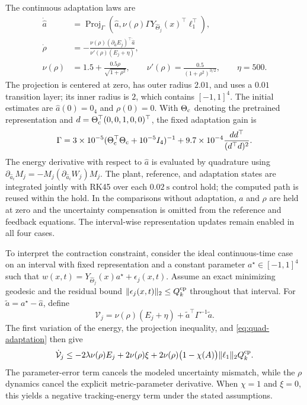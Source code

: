\documentclass[11pt]{article}
\begin{document}
The continuous adaptation laws are
\begin{equation}\label{eq:quad-adaptation}
\begin{aligned}
    \dot{\hat a}&=\operatorname{Proj}_{\Gamma}\left(
       \hat a,\nu(\rho)\Gamma Y_{\hat\Theta_j}(x)^\top\ell_1^\top\right),\\
    \dot\rho&=-\frac{\nu(\rho)
       (\partial_{\hat a}E_j)^\top\dot{\hat a}}
       {\nu'(\rho)(E_j+\eta)},\\
    \nu(\rho)&=1.5+\frac{0.5\rho}{\sqrt{1+\rho^2}},\qquad
    \nu'(\rho)=\frac{0.5}{(1+\rho^2)^{3/2}},\qquad\eta=500.
\end{aligned}
\end{equation}
The projection is centered at zero, has outer radius $2.01$, and uses
a $0.01$ transition layer; its inner radius is $2$, which contains
$[-1,1]^4$. The initial estimates are $\hat a(0)=0_4$ and $\rho(0)=0$.
With $\Theta_{\rm c}$ denoting the pretrained representation and
$d=\Theta_{\rm c}^\top(0,0,1,0,0)^\top$, the fixed adaptation gain is
\begin{equation}
    \Gamma=3\times10^{-5}
        (\Theta_{\rm c}^\top\Theta_{\rm c}+10^{-5}I_4)^{-1}
        +9.7\times10^{-4}\frac{dd^\top}{(d^\top d)^2}.
\end{equation}
The energy derivative with respect to $\hat a$ is evaluated by quadrature
using $\partial_{\hat a_i}M_j=-M_j(\partial_{\hat a_i}W_j)M_j$.
The plant, reference, and adaptation states are integrated jointly
with RK45 over each $0.02~\mathrm s$ control hold; the computed path
is reused within the hold. In the comparisons without adaptation,
$\hat a$ and $\rho$ are held at zero and the uncertainty compensation
is omitted from the reference and feedback equations.
The interval-wise representation updates remain enabled in all four cases.

To interpret the contraction constraint, consider the ideal continuous-time
case on an interval with fixed representation and a constant parameter
$a^\star\in[-1,1]^4$ such that
$w(x,t)=Y_{\hat\Theta_j}(x)a^\star+\epsilon_j(x,t)$.
Assume an exact minimizing geodesic and the residual bound
$\|\epsilon_j(x,t)\|_2\le Q_k^{\rm cp}$ throughout that interval.
For $\tilde a=a^\star-\hat a$, define
\begin{equation}
    \mathcal V_j=\nu(\rho)(E_j+\eta)
       +\tilde a^\top\Gamma^{-1}\tilde a.
\end{equation}
The first variation of the energy, the projection inequality, and
\eqref{eq:quad-adaptation} then give
\begin{equation}\label{eq:quad-conditional-decay}
    \dot{\mathcal V}_j\le
       -2\lambda\nu(\rho)E_j+2\nu(\rho)\xi
       +2\nu(\rho)\big(1-\chi(A)\big)
            \|\ell_1\|_2Q_k^{\rm cp}.
\end{equation}
The parameter-error term cancels the modeled uncertainty mismatch,
while the $\rho$ dynamics cancel the explicit metric-parameter derivative.
When $\chi=1$ and $\xi=0$, this yields a negative tracking-energy
term under the stated assumptions.
\end{document}

